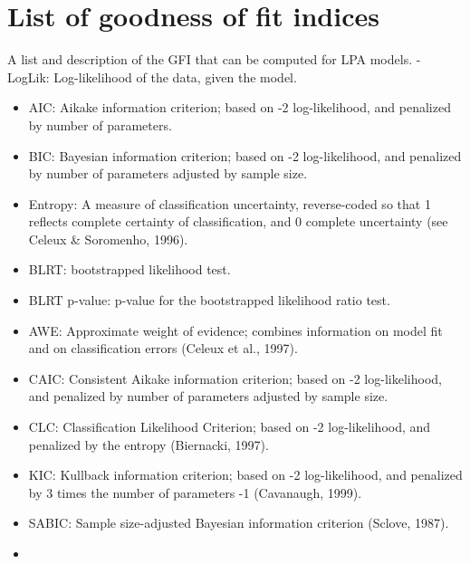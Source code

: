 \documentclass[]{article}
\begin{document}
\newpage

\hypertarget{list-of-goodness-of-fit-indices}{%
\section{List of goodness of fit
indices}\label{list-of-goodness-of-fit-indices}}

A list and description of the GFI that can be computed for LPA models. -
LogLik: Log-likelihood of the data, given the model.

\begin{itemize}
\item
  AIC: Aikake information criterion; based on -2 log-likelihood, and
  penalized by number of parameters.\\
\item
  BIC: Bayesian information criterion; based on -2 log-likelihood, and
  penalized by number of parameters adjusted by sample size.\\
\item
  Entropy: A measure of classification uncertainty, reverse-coded so
  that 1 reflects complete certainty of classification, and 0 complete
  uncertainty (see Celeux \& Soromenho, 1996).\\
\item
  BLRT: bootstrapped likelihood test.\\
\item
  BLRT p-value: p-value for the bootstrapped likelihood ratio test.
\item
  AWE: Approximate weight of evidence; combines information on model fit
  and on classification errors (Celeux et al., 1997).\\
\item
  CAIC: Consistent Aikake information criterion; based on -2
  log-likelihood, and penalized by number of parameters adjusted by
  sample size.\\
\item
  CLC: Classification Likelihood Criterion; based on -2 log-likelihood,
  and penalized by the entropy (Biernacki, 1997).\\
\item
  KIC: Kullback information criterion; based on -2 log-likelihood, and
  penalized by 3 times the number of parameters -1 (Cavanaugh, 1999).\\
\item
  SABIC: Sample size-adjusted Bayesian information criterion (Sclove,
  1987).\\
\item

\end{itemize}
\end{document}
